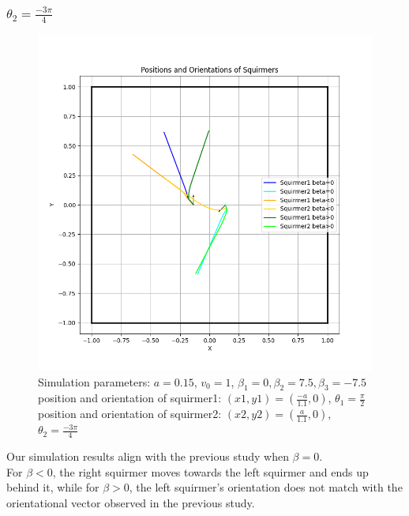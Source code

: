 \documentclass{article}
\begin{document}
\subsubsection{$\theta_2 = \frac{-3\pi}{4}$}
\begin{figure}[h]
   \centering
   \includegraphics[width=1\textwidth]{graphs/simulations/twosquirmerinter/sq2.-3pi.4.png}
   \caption{\footnotesize Simulation parameters: $a=0.15$, $v_0=1$, $\beta_1=0, \beta_2=7.5, \beta_3=-7.5$\\
   position and orientation of squirmer1: $(x1,y1)=(\frac{-a}{1.1},0)$, $\theta_1=\frac{\pi}{2}$\\
   position and orientation of squirmer2: $(x2,y2)=(\frac{a}{1.1},0)$, $\theta_2=\frac{-3\pi}{4}$}
\end{figure}

Our simulation results align with the previous study when $\beta = 0$.\\
For $\beta < 0$, the right squirmer moves towards the left squirmer and ends up behind it,
 while for $\beta > 0$, the left squirmer's orientation does not match with the 
 orientational vector observed in the previous study.\\

\newpage
\end{document}
